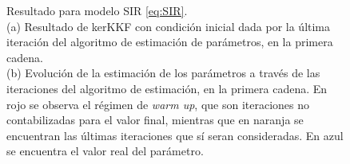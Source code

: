 \begin{figure}[h]
\begin{subfigure}[b]{0.49\textwidth}
       \caption{}
   \end{subfigure}
    \caption{Resultado para modelo SIR \eqref{eq:SIR}. \\
    (a) Resultado de kerKKF con condición inicial dada por la última iteración del algoritmo de estimación de parámetros, en la primera cadena. \\
    (b) Evolución de la estimación de los parámetros a través de las iteraciones del algoritmo de estimación, en la primera cadena. En rojo se observa el régimen de \textit{warm up}, que son iteraciones no contabilizadas para el valor final, mientras que en naranja se encuentran las últimas iteraciones que sí seran consideradas. En azul se encuentra el valor real del parámetro.}
    \label{fig:param_estim_SIR}
\end{figure}

